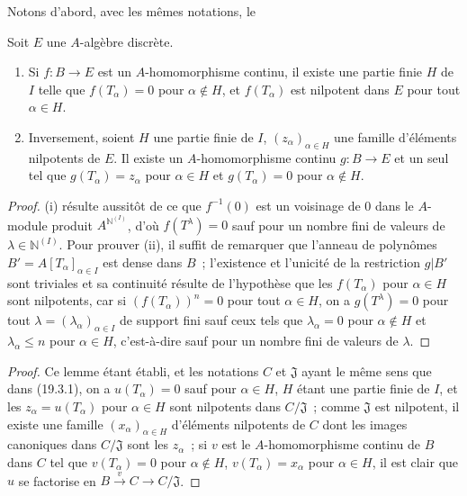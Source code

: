 Notons d'abord, avec les mêmes notations, le
\begin{lemma}[19.3.4.1]
\label{0.19.3.4.1-fr}
Soit $E$ une $A$-algèbre discrète.
\begin{enumerate}
  \item[\textup{(i)}] Si $f:B\to E$ est un $A$-homomorphisme continu, il existe une
  partie finie $H$ de $I$ telle que $f(T_\alpha)=0$ pour $\alpha\notin H$,
  et $f(T_\alpha)$ est nilpotent dans $E$ pour tout $\alpha\in H$.
  \item[\textup{(ii)}] Inversement, soient $H$ une partie finie de $I$,
  $(z_\alpha)_{\alpha\in H}$ une famille d'éléments nilpotents de $E$.
  Il existe un $A$-homomorphisme continu $g:B\to E$ et un seul tel que
  $g(T_\alpha)=z_\alpha$ pour $\alpha\in H$ et
  $g(T_\alpha)=0$ pour $\alpha\notin H$.
\end{enumerate}
\end{lemma}

\begin{proof}
(i) résulte aussitôt de ce que $f^{-1}(0)$ est un voisinage de $0$ dans le
$A$-module produit $A^{\mathbb{N}^{(I)}}$, d'où $f(T^\lambda)=0$ sauf pour un
nombre fini de valeurs de $\lambda\in\mathbb{N}^{(I)}$. Pour prouver (ii), il
suffit de remarquer que l'anneau de polynômes
$B'=A[T_\alpha]_{\alpha\in I}$ est dense dans $B$~; l'existence et
l'unicité de la restriction $g|B'$ sont triviales et sa continuité résulte de
l'hypothèse que les $f(T_\alpha)$ pour $\alpha\in H$ sont nilpotents,
car si $(f(T_\alpha))^n=0$ pour tout $\alpha\in H$, on a
$g(T^\lambda)=0$ pour tout $\lambda=(\lambda_\alpha)_{\alpha\in I}$ de
support fini sauf ceux tels que $\lambda_\alpha=0$ pour
$\alpha\notin H$ et $\lambda_\alpha\leq n$ pour
$\alpha\in H$, c'est-à-dire sauf pour un nombre fini de valeurs de
$\lambda$.
\end{proof}

\begin{proof}
Ce lemme étant établi, et les notations $C$ et $\mathfrak J$ ayant le même
sens que dans (19.3.1), on a $u(T_\alpha)=0$ sauf pour
$\alpha\in H$, $H$ étant une partie finie de $I$, et les
$z_\alpha=u(T_\alpha)$ pour $\alpha\in H$ sont nilpotents dans
$C/\mathfrak J$~; comme $\mathfrak J$ est nilpotent, il existe une famille
$(x_\alpha)_{\alpha\in H}$ d'éléments nilpotents de $C$ dont les images
canoniques dans $C/\mathfrak J$ sont les $z_\alpha$~; si $v$ est le
$A$-homomorphisme continu de $B$ dans $C$ tel que
$v(T_\alpha)=0$ pour $\alpha\notin H$, $v(T_\alpha)=x_\alpha$ pour
$\alpha\in H$, il est clair que $u$ se factorise en
$B\xrightarrow{v}C\to C/\mathfrak J$.
\end{proof}

